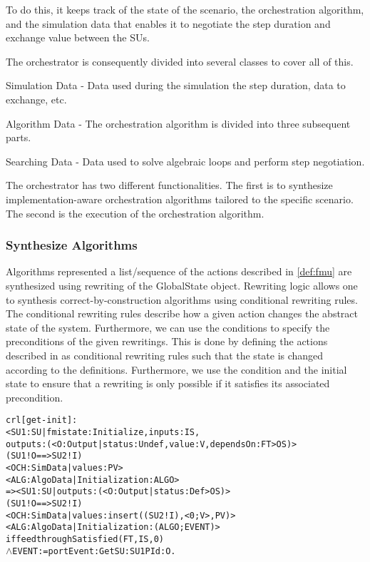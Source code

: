 To do this, it keeps track of the state of the scenario, the orchestration algorithm, and the simulation data that enables it to negotiate the step duration and exchange value between the SUs.

The orchestrator is consequently divided into several classes to cover all of this.
\begin{compactitem}
  \item Simulation Data - Data used during the simulation the step duration, data to exchange, etc.
  \item Algorithm Data - The orchestration algorithm is divided into three subsequent parts. 
  \item Searching Data - Data used to solve algebraic loops and perform step negotiation.
\end{compactitem}

The orchestrator has two different functionalities.
The first is to synthesize implementation-aware orchestration algorithms tailored to the specific scenario.
The second is the execution of the orchestration algorithm. 

\subsubsection{Synthesize Algorithms}
Algorithms represented a list/sequence of the actions described in \cref{def:fmu} are synthesized using rewriting of the GlobalState object.
Rewriting logic allows one to synthesis correct-by-construction algorithms using conditional rewriting rules.
The conditional rewriting rules describe how a given action changes the abstract state of the system.
Furthermore, we can use the conditions to specify the preconditions of the given rewritings.
This is done by defining the actions described in  as conditional rewriting rules such that the state is changed according to the definitions.
Furthermore, we use the condition and the initial state to ensure that a rewriting is only possible if it satisfies its associated precondition.

\begin{alltt}
  crl [get-init] :
  < SU1 : SU | fmistate : Initialize, inputs : IS, 
    outputs : (< O : Output | status : Undef, value : V, dependsOn : FT > OS) > 
  (SU1 ! O ==> SU2 ! I)
  < OCH : SimData | values : PV > 
  < ALG : AlgoData | Initialization : ALGO >
  => < SU1 : SU | outputs : (< O : Output | status : Def > OS) > 
    (SU1 ! O ==> SU2 ! I)
    < OCH : SimData | values : insert((SU2 ! I), < 0 ; V >, PV) >  
    < ALG : AlgoData | Initialization : (ALGO ; EVENT) >
if feedthroughSatisfied(FT, IS, 0)
  \(\land\) EVENT := portEvent: Get SU: SU1 PId: O . 
\end{alltt}

